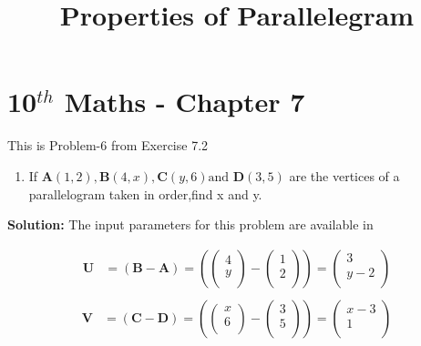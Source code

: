 \documentclass[12pt]{article}
\providecommand{\brak}[1]{\ensuremath{\left(#1\right)}}
\newcommand{\solution}{\noindent \textbf{Solution: }}
\newcommand{\myvec}[1]{\ensuremath{\begin{pmatrix}#1\end{pmatrix}}}
\let\vec\mathbf
\begin{document}
\begin{center}
\title{\textbf{Properties of Parallelegram}}
\date{\vspace{-5ex}} %
\maketitle
\end{center}

\setcounter{page}{1}

\section{10$^{th}$ Maths - Chapter 7}

This is Problem-6 from Exercise 7.2

\begin{enumerate}
\item If $\vec{A}(1, 2),\vec{B}(4, x),\vec{C}(y, 6) \text{and } \vec{D}(3, 5)$ are the vertices of a parallelogram taken in order,find x and y.
\end{enumerate}

\solution The input parameters for this problem are available in
\begin{center}
\begin{table}[ht!]
	
\caption{}
\label{table}	
\end{table}
\end{center}
\begin{align}
  \label{eq:det2f}
  \vec{U} &=\brak{\vec{B}-\vec{A}} = \brak{\myvec{
  4 \\
  y \\
 } - \myvec{
  1 \\
  2 \\
 } 
 } = \myvec{
 3 \\
 y-2 \\
 }   \\
 \end{align}
 \begin{align}
   \vec{V} &= \brak{\vec{C}-\vec{D}} = \brak{\myvec{
  x \\
  6 \\
 } - \myvec{
  3 \\
  5 \\
 } 
 } = \myvec{
 x-3 \\
 1 \\
 }   \\
 \end{align}
  
\end{document}
